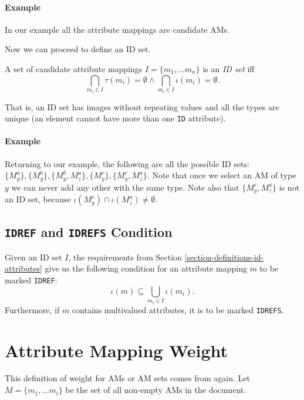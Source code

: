 \paragraph{Example}
In our example all the attribute mappings are candidate AMs.

Now we can proceed to define an ID set.

\begin{define}[ID set]
A set of candidate attribute mappings $I = \{m_1, \ldots m_n\}$ is an \textit{ID set} iff
\[\bigcap_{m_i \in I} \tau(m_i) = \emptyset \wedge \bigcap_{m_i \in I} \iota(m_i) = \emptyset.\]
\end{define}

That is, an ID set has images without repeating values and all the types are unique (an element cannot have more than one \texttt{ID} attribute).

\paragraph{Example}
Returning to our example, the following are all the possible ID sets: $\{ M_{y}^{a} \}, \{ M_{y}^{b} \}, \{ M_{y}^{b}, M_{z}^{a} \}, \{ M_{y}^{c} \}, \{ M_{y}^{c}, M_{z}^{a} \}$. Note that once we select an AM of type $y$ we can never add any other with the same type. Note also that $\{ M_{y}^{c}, M_{z}^{a} \}$ is not an ID set, because $\iota(M_{y}^{c}) \cap \iota(M_{z}^{a}) \neq \emptyset$.

\subsection*{\texttt{IDREF} and \texttt{IDREFS} Condition}

Given an ID set $I$, the requirements from Section \ref{section-definitions-id-attributes} give us the following condition for an attribute mapping $m$ to be marked \texttt{IDREF}:
\[\iota(m) \subseteq \bigcup_{m_i \in I} \iota(m_i).\]
Furthermore, if $m$ contains multivalued attributes, it is to be marked \texttt{IDREFS}.

\section{Attribute Mapping Weight}
\label{section-definitions-weight}

This definition of weight for AMs or AM sets comes from \cite{fidax} again. Let $M = \{m_1, \dots m_i\}$ be the set of all non-empty AMs in the document.

